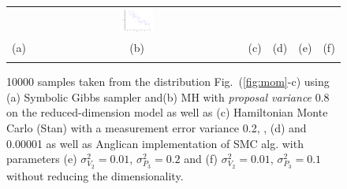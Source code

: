 \documentclass{article}
\newcommand{\nn}{0.16}
\begin{document}
{\begin{figure}[t!]
\begin{center}
\begin{tabular}{cccccc}
& \hspace{-3mm} \includegraphics[width=\nn\textwidth]{Figs2/col_c_ang_10000_01_001}
\vspace{-1.5mm}
\\
   \hspace{-5mm} \footnotesize(a) 
& \hspace{-4mm} \footnotesize(b) 
& \hspace{-3mm} \footnotesize(c) 
&\hspace{-1mm} \footnotesize(d) 
&\hspace{-1mm} \footnotesize(e) 
&\hspace{-1mm} \footnotesize(f)\\
\multicolumn{6}{c}{}
\end{tabular}
\end{center}
\vspace{-8mm}
\caption{\footnotesize
10000 samples taken from the distribution Fig.~(\ref{fig:mom}-c)
using (a) Symbolic Gibbs sampler and(b) MH with \emph{proposal variance} 0.8 
on the reduced-dimension model as well as  
(c) Hamiltonian Monte Carlo (Stan) with a measurement error variance 0.2, 
, (d) and 0.00001 as well as Anglican implementation of SMC alg. with %
parameters (e)
$\sigma^2_{V_2} = 0.01$, $\sigma^2_{P_3} = 0.2$ and 
(f) $\sigma^2_{V_2} = 0.01$, $\sigma^2_{P_3} = 0.1$
without reducing the dimensionality.
}
\label{fig:mom2}
\vspace{-4mm}
\end{figure}

}
\end{document}

